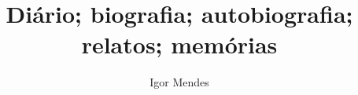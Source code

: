 \documentclass[11pt]{extarticle}
\begin{document}



\newcommand{\AutorLivro}{Igor Mendes}
\newcommand{\TituloLivro}{Diário; biografia; autobiografia; relatos; memórias}
\newcommand{\Tema}{Protagonismo juvenis}
\newcommand{\Genero}{Diário; biografia; autobiografia; relatos; memórias}
\newcommand{\issnppub}{---}
\newcommand{\issnepub}{---}
\newcommand{\colaborador}{\textbf{Rebeca Martins de Souza}}


\title{\TituloLivro}
\author{\AutorLivro}
\def\authornotes{\colaborador}

\date{}
\maketitle
\end{document}
